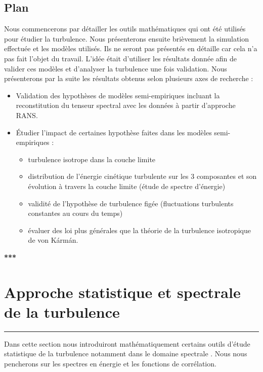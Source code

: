 \documentclass[12pt]{article}
\theoremstyle{plain}
\theoremstyle{remark}
\begin{document}
	\subsection{Plan}
	Nous commencerons par détailler les outils mathématiques qui ont été utilisés pour étudier la turbulence. Nous présenterons ensuite brièvement la simulation effectuée et les modèles utilisés. Ils ne seront pas présentés en détaille car cela n'a pas fait l'objet du travail. L'idée était d'utiliser les résultats donnée afin de valider ces modèles et d'analyser la turbulence une fois validation. Nous présenterons par la suite les résultats obtenus selon plusieurs axes de recherche : 
	\begin{itemize}
		\item Validation des hypothèses de modèles semi-empiriques incluant la reconstitution du tenseur spectral avec les données à partir d'approche RANS.
		\item Étudier l'impact de certaines hypothèse faites dans les modèles semi-empiriques : 
		\begin{itemize}
			\item turbulence isotrope dans la couche limite
			\item distribution de l'énergie cinétique turbulente sur les 3 composantes et son évolution à travers la couche limite (étude de spectre d'énergie)
			\item validité de l'hypothèse de turbulence figée (fluctuations turbulents constantes au cours du temps)
			\item évaluer des loi plus générales que la théorie de la turbulence isotropique de von Kármán.
		\end{itemize}
	\end{itemize}

\begin{center}
	\large {\bf{***}}
\end{center}

\vspace{0.3cm}
\section{Approche statistique et spectrale de la turbulence}
\noindent\rule{\linewidth}{2pt}
\vspace{0.1cm}

	Dans cette section nous introduiront mathématiquement certains outils d'étude statistique de la turbulence notamment dans le domaine spectrale \cite{mathieu2000introduction}. Nous nous pencherons sur les spectres en énergie et les fonctions de corrélation.
	
\end{document}
